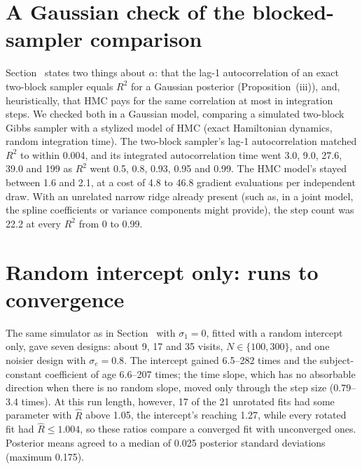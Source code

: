 \section{A Gaussian check of the blocked-sampler comparison}\label{sec:gausscheck}

Section~ states two things about $\alpha$: that the
lag-1 autocorrelation of an exact two-block sampler equals $R^2$ for a
Gaussian posterior (Proposition~(iii)), and,
heuristically, that HMC pays for the same correlation at most in
integration steps. We checked both in a Gaussian model, comparing a
simulated two-block Gibbs sampler with a stylized model of HMC (exact
Hamiltonian dynamics, random integration time). The two-block sampler's
lag-1 autocorrelation matched $R^2$ to within 0.004, and its integrated
autocorrelation time went 3.0, 9.0, 27.6, 39.0 and 199 as $R^2$ went 0.5,
0.8, 0.93, 0.95 and 0.99. The HMC model's stayed between 1.6 and 2.1, at a
cost of 4.8 to 46.8 gradient evaluations per independent draw. With an
unrelated narrow ridge already present (such as, in a joint model, the
spline coefficients or variance components might provide), the step count was 22.2 at
every $R^2$ from 0 to 0.99.

\section{Random intercept only: runs to convergence}\label{sec:longrun}

The same simulator as in Section~ with $\sigma_1 =
0$, fitted with a random intercept only, gave seven designs: about 9, 17
and 35 visits, $N \in \{100, 300\}$, and one noisier design with $\sigma_e
= 0.8$. The intercept gained 6.5--282 times and the subject-constant
coefficient of age 6.6--207 times; the time slope, which has no absorbable
direction when there is no random slope, moved only through the step size
(0.79--3.4 times). At this run length, however, 17 of the 21 unrotated fits
had some parameter with $\hat R$ above 1.05, the intercept's reaching 1.27,
while every rotated fit had $\hat R \leq 1.004$, so these ratios compare a
converged fit with unconverged ones. Posterior means agreed to a median of
0.025 posterior standard deviations (maximum 0.175).

